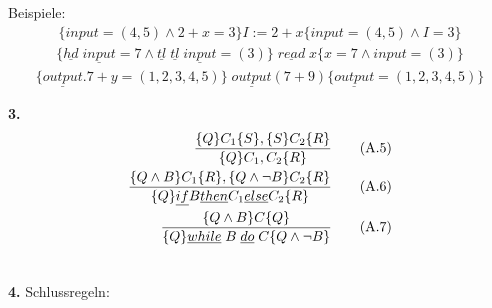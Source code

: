 \begin{compactitem}
		Beispiele:
		\begin{align*}
		\{input=(4,5)\land2+x=3\} I:=2+x \{input=(4,5)\land I=3\}
		\end{align*}
		\begin{align*}
		\{\underline{hd}\;\underline{input}=7 \land \underline{tl}\; \underline{tl}\;\underline{input}=(3) \}\;\underline{read}\; x \{x=7 \land input=(3)\}
		\end{align*}
		\begin{align*}
		\{\underline{output}.7+y=(1,2,3,4,5)\}\; \underline{output} (7+9) \{\underline{output} = (1,2,3,4,5)\}
		\end{align*}
	\item[\textbf{3.}]
	\begin{align}
	\frac{\{Q\}C_1\{S\},\{S\}C_2\{R\}}{\{Q\}C_1,C_2\{R\}}\tag{A.5}\\
	\frac{\{Q\land B\}C_1\{R\},\{Q\land \lnot B\}C_2\{R\}}{\{Q\}\underline{if}B\underline{then}C_1\underline{else}C_2\{R\}}\tag{A.6}\\
	\frac{\{Q\land B\}C\{Q\}}{\{Q\}\underline{while}\;B\;\underline{do}\;C\{Q\land \lnot B\}}\tag{A.7}\\
	\notag
	\end{align}
	\item[\textbf{4.}] Schlussregeln:\\
	
\end{compactitem}
